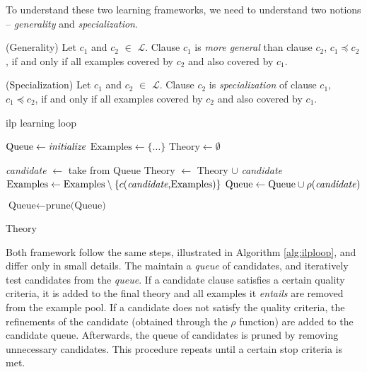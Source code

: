 To understand these two learning frameworks, we need to understand two notions -- \textit{generality} and \textit{specialization}.

\begin{definition}{(Generality)}
Let $c_1$ and $c_2$ $\in$ $\mathcal{L}$. 
Clause $c_1$ is \textit{more general} than clause $c_2$, $c_1 \preceq c_2$, if and only if all examples covered by $c_2$ and also covered by $c_1$. 
\end{definition}



\begin{definition}{(Specialization)}
Let $c_1$ and $c_2$ $\in$ $\mathcal{L}$. 
Clause $c_2$ is \textit{specialization} of clause $c_1$, $c_1 \preceq c_2$, if and only if all examples covered by $c_2$ and also covered by $c_1$. 
\end{definition}




\begin{algorithm}
	
	\caption{\gls{ilp} learning loop}
	\begin{algorithmic}
		\STATE $\text{Queue} \leftarrow \text{\textit{initialize}}$
		\STATE $\text{Examples} \leftarrow \{\text{\ldots}\}$
		\STATE $\text{Theory} \leftarrow \emptyset$
		
			\STATE \textit{candidate} $\leftarrow$ take from Queue
				\STATE Theory $\leftarrow$ Theory $\cup$ \textit{candidate}
				\STATE $\text{Examples} \leftarrow \text{Examples} \setminus \{c(\text{\textit{candidate},Examples})\}$
			\ELSE
				\STATE $\text{Queue} \leftarrow \text{Queue} \cup \rho(\text{\textit{candidate}})$
			\ENDIF
			
			\STATE $\text{Queue} \leftarrow \text{prune(Queue)}$
				
		\ENDWHILE
		\RETURN Theory
		
	\end{algorithmic}
	\label{alg:ilploop}
\end{algorithm}


Both framework follow the same steps, illustrated in Algorithm \ref{alg:ilploop}, and differ only in small details.
The maintain a \textit{queue} of candidates, and iteratively test candidates from the \textit{queue}.
If a candidate clause satisfies a certain quality criteria, it is added to the final theory and all examples it \textit{entails} are removed from the example pool.
If a candidate does not satisfy the quality criteria, the refinements of the candidate (obtained through the $\rho$ function) are added to the candidate queue.
Afterwards, the queue of candidates is pruned by removing unnecessary candidates.
This procedure repeats until a certain stop criteria is met.



